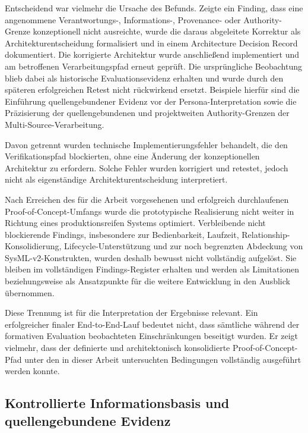 Entscheidend war vielmehr die Ursache des Befunds. Zeigte ein Finding, dass eine
angenommene Verantwortungs-, Informations-, Provenance- oder Authority-Grenze
konzeptionell nicht ausreichte, wurde die daraus abgeleitete Korrektur als
Architekturentscheidung formalisiert und in einem Architecture Decision Record
dokumentiert. Die korrigierte Architektur wurde anschließend implementiert und
am betroffenen Verarbeitungspfad erneut geprüft. Die ursprüngliche Beobachtung
blieb dabei als historische Evaluationsevidenz erhalten und wurde durch den
späteren erfolgreichen Retest nicht rückwirkend ersetzt. Beispiele hierfür sind
die Einführung quellengebundener Evidenz vor der Persona-Interpretation sowie
die Präzisierung der quellengebundenen und projektweiten Authority-Grenzen der
Multi-Source-Verarbeitung.

Davon getrennt wurden technische Implementierungsfehler behandelt, die den
Verifikationspfad blockierten, ohne eine Änderung der konzeptionellen
Architektur zu erfordern. Solche Fehler wurden korrigiert und retestet, jedoch
nicht als eigenständige Architekturentscheidung interpretiert.

Nach Erreichen des für die Arbeit vorgesehenen und erfolgreich durchlaufenen
Proof-of-Concept-Umfangs wurde die prototypische Realisierung nicht weiter in
Richtung eines produktionsreifen Systems optimiert. Verbleibende nicht
blockierende Findings, insbesondere zur Bedienbarkeit, Laufzeit,
Relationship-Konsolidierung, Lifecycle-Unterstützung und zur noch begrenzten
Abdeckung von SysML-v2-Konstrukten, wurden deshalb bewusst nicht vollständig
aufgelöst. Sie bleiben im vollständigen Findings-Register erhalten und werden
als Limitationen beziehungsweise als Ansatzpunkte für die weitere Entwicklung
in den Ausblick übernommen.

Diese Trennung ist für die Interpretation der Ergebnisse relevant. Ein
erfolgreicher finaler End-to-End-Lauf bedeutet nicht, dass sämtliche während
der formativen Evaluation beobachteten Einschränkungen beseitigt wurden.
Er zeigt vielmehr, dass der definierte und architektonisch konsolidierte
Proof-of-Concept-Pfad unter den in dieser Arbeit untersuchten Bedingungen
vollständig ausgeführt werden konnte.

\subsection{Kontrollierte Informationsbasis und quellengebundene Evidenz}
\label{sec:discussion_information_basis}

